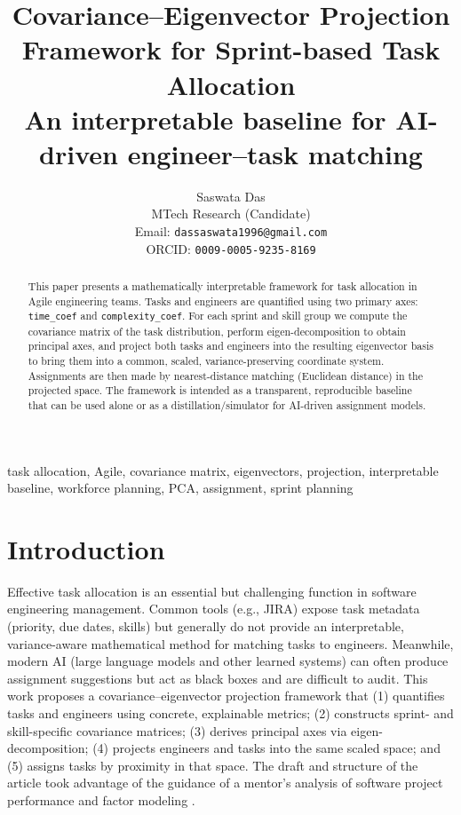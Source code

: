 \documentclass[journal]{IEEEtran}
\begin{document}
\title{Covariance--Eigenvector Projection Framework for Sprint-based Task Allocation\\
\large An interpretable baseline for AI-driven engineer–task matching}

\author{Saswata Das\\
\small MTech Research (Candidate)\\
\small Email: \texttt{dassaswata1996@gmail.com}\\
\small ORCID: \texttt{0009-0005-9235-8169}}

\maketitle

\begin{abstract}
This paper presents a mathematically interpretable framework for task allocation in Agile engineering teams. Tasks and engineers are quantified using two primary axes: \texttt{time\_coef} and \texttt{complexity\_coef}. For each sprint and skill group we compute the covariance matrix of the task distribution, perform eigen-decomposition to obtain principal axes, and project both tasks and engineers into the resulting eigenvector basis to bring them into a common, scaled, variance-preserving coordinate system. Assignments are then made by nearest-distance matching (Euclidean distance) in the projected space. The framework is intended as a transparent, reproducible baseline that can be used alone or as a distillation/simulator for AI-driven assignment models.
\end{abstract}

\begin{IEEEkeywords}
task allocation, Agile, covariance matrix, eigenvectors, projection, interpretable baseline, workforce planning, PCA, assignment, sprint planning
\end{IEEEkeywords}

\section{Introduction}\label{sec:intro}
Effective task allocation is an essential but challenging function in software engineering management. Common tools (e.g., JIRA) expose task metadata (priority, due dates, skills) but generally do not provide an interpretable, variance-aware mathematical method for matching tasks to engineers. Meanwhile, modern AI (large language models and other learned systems) can often produce assignment suggestions but act as black boxes and are difficult to audit. This work proposes a covariance--eigenvector projection framework that (1) quantifies tasks and engineers using concrete, explainable metrics; (2) constructs sprint- and skill-specific covariance matrices; (3) derives principal axes via eigen-decomposition; (4) projects engineers and tasks into the same scaled space; and (5) assigns tasks by proximity in that space. The draft and structure of the article took advantage of the guidance of a mentor's analysis of software project performance and factor modeling \cite{mentor_paper}.
\end{document}
